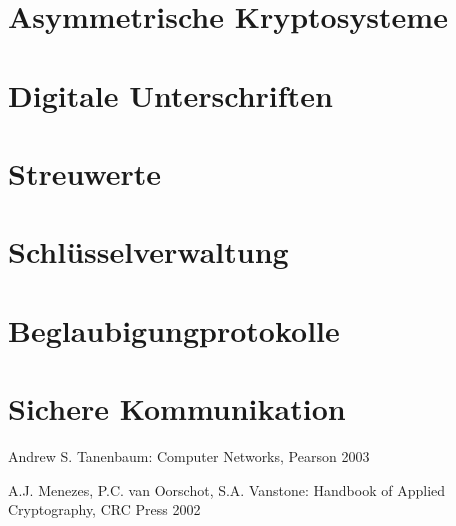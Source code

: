 \documentclass[a4paper,12pt]{article}
\begin{document}
\section{Asymmetrische Kryptosysteme}

\section{Digitale Unterschriften}

\section{Streuwerte}

\section{Schlüsselverwaltung}

\section{Beglaubigungprotokolle}

\section{Sichere Kommunikation}


\begin{thebibliography}{9}
Andrew S. Tanenbaum: Computer Networks, Pearson 2003

A.J. Menezes, P.C. van Oorschot, S.A. Vanstone: Handbook of Applied Cryptography, CRC Press 2002
\end{thebibliography}
\end{document}
